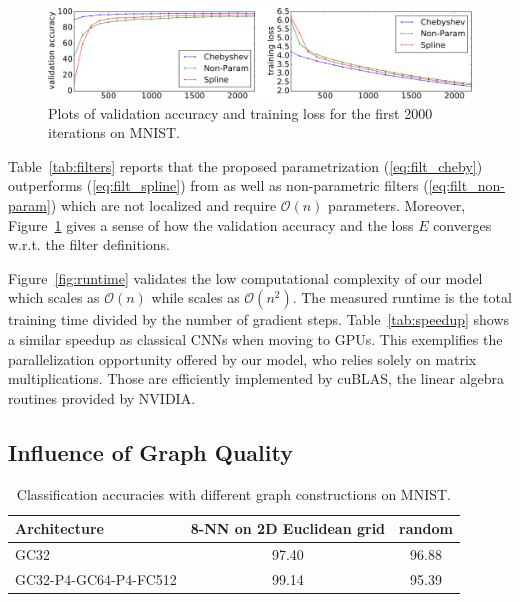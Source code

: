 \documentclass{article}
\newcommand{\bO}{\mathcal{O}}
\newcommand{\figref}[1]{Figure~\ref{fig:#1}}
\newcommand{\tabref}[1]{Table~\ref{tab:#1}}
\newcommand{\eqnref}[1]{(\ref{eq:#1})}
\begin{document}
\begin{figure}[t]
\centering
\includegraphics[width=\textwidth]{images/training}
\caption{Plots of validation accuracy and training loss for the first 2000
iterations on MNIST.}
\label{fig:convergence}
\end{figure}

\tabref{filters} reports that the proposed parametrization \eqnref{filt_cheby}
outperforms \eqnref{filt_spline} from \cite{art:BrunaZarembaSzlamLeCun13DLgraphs} as well as non-parametric
filters \eqnref{filt_non-param} which are not localized and require $\bO(n)$
parameters. Moreover, \figref{convergence} gives a sense of how the validation
accuracy and the loss $E$ converges w.r.t. the filter definitions.

\figref{runtime} validates the low computational complexity of our model which
scales as $\bO(n)$ while \cite{art:BrunaZarembaSzlamLeCun13DLgraphs} scales as $\bO(n^2)$. The measured
runtime is the total training time divided by the number of gradient steps.
\tabref{speedup} shows a similar speedup as classical CNNs when moving to GPUs.
This exemplifies the parallelization opportunity offered by our model, who
relies solely on matrix multiplications. Those are efficiently implemented by
cuBLAS, the linear algebra routines provided by NVIDIA.

\subsection{Influence of Graph Quality} \label{sec:graph_quality}

\begin{table}[t]
\centering
\begin{tabular}{lcc} \toprule
Architecture & 8-NN on 2D Euclidean grid & random \\
\midrule
GC32 & 97.40 & 96.88 \\
GC32-P4-GC64-P4-FC512 & 99.14 & 95.39 \\
\bottomrule \end{tabular}
\caption{Classification accuracies with different graph constructions on MNIST.} 
\label{tab:mnist_quality}
\end{table}
\end{document}
